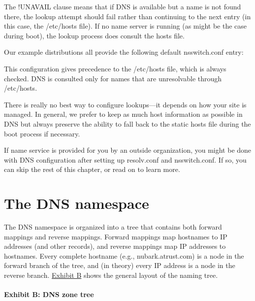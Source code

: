 
The {!UNAVAIL} clause means that if DNS is available but a name is not
found there, the lookup attempt should fail rather than continuing to
the next entry (in this case, the {/etc/hosts} file). If no name server
is running (as might be the case during boot), the lookup process does
consult the {hosts} file.

Our example distributions all provide the following default
{nsswitch.conf} entry:


This configuration gives precedence to the {/etc/hosts} file, which is
always checked. DNS is consulted only for names that are unresolvable
through {/etc/hosts}.

There is really no best way to configure lookups---it depends on how
your site is managed. In general, we prefer to keep as much host
information as possible in DNS but always preserve the ability to fall
back to the static {hosts} file during the boot process if necessary.

If name service is provided for you by an outside organization, you
might be done with DNS configuration after setting up {resolv.conf} and
{nsswitch.conf}. If so, you can skip the rest of this chapter, or read
on to learn more.




\section{The DNS namespace}

\protect\hypertarget{part0024_split_007.htmlux5cux23_idIndexMarker1984}{}{}The
DNS namespace is organized into a tree that contains both
\protect\hypertarget{part0024_split_007.htmlux5cux23_idIndexMarker1985}{}{}forward
mappings and
\protect\hypertarget{part0024_split_007.htmlux5cux23_idIndexMarker1986}{}{}reverse
mappings. Forward mappings map hostnames to IP addresses (and other
records), and reverse mappings map IP addresses to hostnames. Every
complete hostname (e.g., nubark.atrust.com) is a node in the forward
branch of the tree, and (in theory) every IP address is a node in the
reverse branch.
\protect\hyperlink{part0024_split_007.htmlux5cux23_idTextAnchor850}{Exhibit
B} shows the general layout of the naming tree.

\paragraph[{Exhibit B: }DNS zone tree]{\texorpdfstring{{Exhibit B:
}\protect\hypertarget{part0024_split_007.htmlux5cux23_idTextAnchor850}{}{}DNS
zone tree}{Exhibit B: DNS zone tree}}

